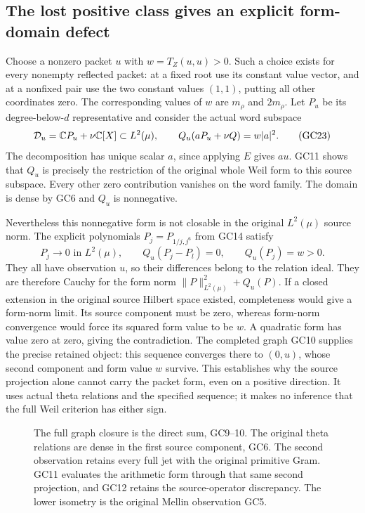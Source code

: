 \subsection{The lost positive class gives an explicit form-domain defect}
Choose a nonzero packet $u$ with $w=T_Z(u,u)>0$. Such a choice
exists for every nonempty reflected packet: at a fixed root use
its constant value vector, and at a nonfixed pair use the two
constant values $(1,1)$, putting all other coordinates zero.
The corresponding values of $w$ are $m_\rho$ and $2m_\rho$.
Let $P_u$ be its degree-below-$d$ representative and consider
the actual word subspace
\[
 \mathcal D_u=\mathbb C P_u+\nu\mathbb C[X]\subset L^2(\mu),\qquad
 Q_u(aP_u+\nu Q)=w|a|^2.
 \tag{GC23}\label{gc:form-domain}
\]
The decomposition has unique scalar $a$, since applying $E$
gives $au$. GC11 shows that $Q_u$ is precisely the restriction
of the original whole Weil form to this source subspace.
Every other zero contribution vanishes on the word family.
The domain is dense by GC6 and $Q_u$ is nonnegative.

Nevertheless this nonnegative form is not closable in the
original $L^2(\mu)$ source norm. The explicit polynomials
$P_j=P_{1/j,j^6}$ from GC14 satisfy
\[
 P_j\longrightarrow0\text{ in }L^2(\mu),\qquad
 Q_u(P_j-P_l)=0,\qquad Q_u(P_j)=w>0.
 \tag{GC24}\label{gc:form-defect}
\]
They all have observation $u$, so their differences belong
to the relation ideal. They are therefore Cauchy for the
form norm $\|P\|_{L^2(\mu)}^2+Q_u(P)$. If a closed extension
in the original source Hilbert space existed, completeness
would give a form-norm limit. Its source component must be
zero, whereas form-norm convergence would force its squared
form value to be $w$. A quadratic form has value zero at zero,
giving the contradiction.
The completed graph GC10 supplies the precise retained object:
this sequence converges there to $(0,u)$, whose second component
and form value $w$ survive. This establishes why the source
projection alone cannot carry the packet form, even on a
positive direction. It uses actual theta relations and the
specified sequence; it makes no inference that the full
Weil criterion has either sign.

\begin{figure}[ht]
\centering
{}
\caption{The full graph closure is the direct sum, GC9--10.
The original theta relations are dense in the first source
component, GC6. The second observation retains every full jet
with the original primitive Gram. GC11 evaluates the arithmetic
form through that same second projection, and GC12 retains the
source-operator discrepancy. The lower isometry is the original
Mellin observation GC5.}
\end{figure}
